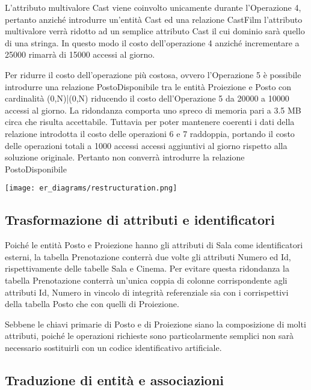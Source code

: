 L'attributo multivalore Cast viene coinvolto unicamente durante l'Operazione 4,
pertanto anziché introdurre un'entità Cast ed una relazione CastFilm
l'attributo multivalore verrà ridotto ad un semplice attributo Cast il cui
dominio sarà quello di una stringa.
In questo modo il costo dell'operazione 4 anziché incrementare a 25000
rimarrà di 15000 accessi al giorno.

Per ridurre il costo dell'operazione più costosa, ovvero l'Operazione 5 è
possibile introdurre una relazione PostoDisponibile tra le entità Proiezione e
Posto con cardinalità (0,N)|(0,N) riducendo il costo dell'Operazione 5 da
20000 a 10000 accessi al giorno.
La ridondanza comporta uno spreco di memoria pari a
3.5 MB circa che risulta accettabile.
Tuttavia per poter mantenere coerenti i dati della relazione introdotta il costo
delle operazioni 6 e 7 raddoppia, portando il costo delle operazioni totali a
1000 accessi accessi aggiuntivi al giorno rispetto alla soluzione originale.
Pertanto non converrà introdurre la relazione PostoDisponibile

\texttt{[image: er\_diagrams/restructuration.png]}

\subsection*{Trasformazione di attributi e identificatori}
%
%

Poiché le entità Posto e Proiezione hanno gli attributi di Sala come
identificatori esterni, la tabella Prenotazione conterrà due volte gli attributi
Numero ed Id, rispettivamente delle tabelle Sala e Cinema.
Per evitare questa ridondanza la tabella Prenotazione conterrà un'unica coppia
di colonne corrispondente agli attributi Id, Numero in vincolo di integrità
referenziale sia con i corrispettivi della tabella Posto che con quelli di
Proiezione.

Sebbene le chiavi primarie di Posto e di Proiezione siano la composizione di
molti attributi, poiché le operazioni richieste sono particolarmente semplici
non sarà necessario sostituirli con un codice identificativo artificiale.

\pagebreak
\subsection*{Traduzione di entità e associazioni}
%
%


